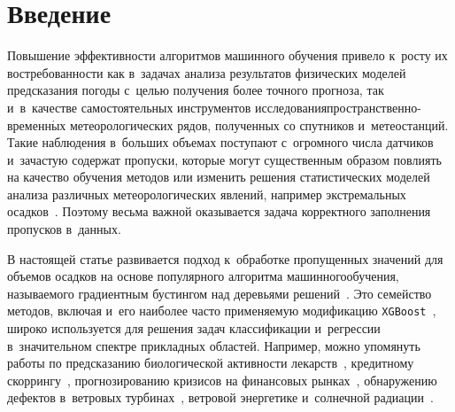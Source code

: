 
  



\thispagestyle{headings}

\begin{multicols}{2}

\label{st\stat}


\section{Введение}

Повышение эффективности алгоритмов машинного обучения привело к~росту их 
востребо\-ванности как в~задачах анализа результатов физических моделей 
предсказания погоды с~целью получения более точного прогноза, так и~в~качестве 
самостоятельных инструментов исследования\linebreak про\-стран\-ственно-вре\-мен\-н$\acute{\mbox{ы}}$х 
метеорологических рядов, %
полученных со спутников и~метеостанций. Такие %
наблюдения в~больших объемах поступают с~огромного числа датчиков и~зачастую 
содержат пропуски, которые могут существенным образом повлиять на качество 
обучения методов или изменить решения статистических моделей анализа различных 
метеорологических явлений, например экстремальных осадков~\cite{Gorshenin2018c}. 
Поэтому  весьма важной оказывается задача корректного заполнения пропусков в~данных.

В настоящей статье развивается подход к~обработке пропущенных значений 
для объемов осадков на основе популярного алгоритма машинного\linebreak обучения, 
называемого градиентным бустингом над деревьями решений~\cite{Friedman2001}. 
Это семейство методов, включая и~его наиболее час\-то применяемую модификацию 
\verb"XGBoost"~\cite{Chen2016}, широко используется для решения задач 
классификации и~регрессии в~значительном спектре прикладных областей. 
Например, можно упомянуть работы по предсказанию биологической активности 
лекарств~\cite{Mustapha2016}, кредитному скоррингу~\cite{Xia2017}, 
прогнозированию кризисов на финансовых рынках~\cite{Chatzis2018}, 
обнаружению дефектов в~вет\-ро\-вых турбинах~\cite{Zhang2018}, вет\-ро\-вой 
энергетике и~солнечной радиации~\cite{Aler2017,Torres-Barran2018}.


\end{multicols}
